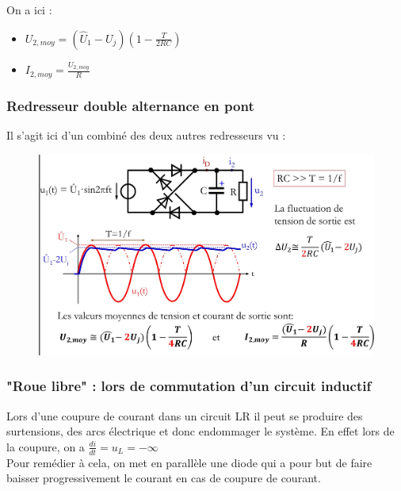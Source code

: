 \documentclass[../main.tex]{subfiles}
\begin{document}
On a ici : \begin{itemize}
    \item $U_{2,moy} = (\hat{U}_1-U_j)(1-\frac{T}{2RC})$\\
    \item $I_{2,moy} = \frac{U_{2,moy}}{R}$\\
\end{itemize}

\subsubsection{Redresseur double alternance en pont}
Il s'agit ici d'un combiné des deux autres redresseurs vu : \\

\begin{figure}[hbt!]
    \centering
    \includegraphics[width=\textwidth]{IMAGES/elec/IMG_0128.jpeg}
\end{figure}

\subsubsection{"Roue libre" : lors de commutation d'un circuit inductif}
Lors d'une coupure de courant dans un circuit LR il peut se produire des surtensions, des arcs électrique et donc endommager le système. En effet lors de la coupure, on a $\frac{di}{dt} = u_L = -\infty$\\
Pour remédier à cela, on met en parallèle une diode qui a pour but de faire baisser progressivement le courant en cas de coupure de courant.\\
\end{document}
